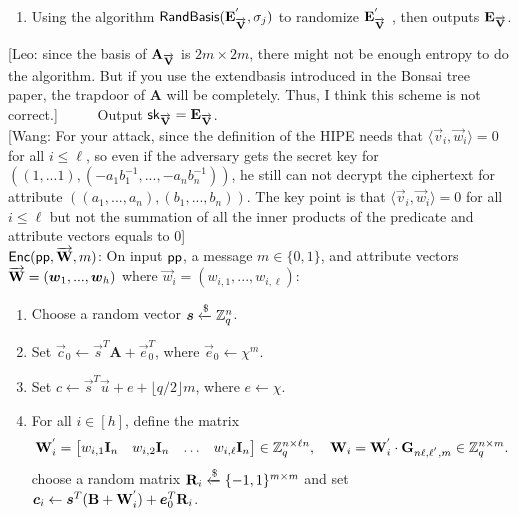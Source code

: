 \documentclass{llncs}
\newcommand{\leo}[1]{{\color{cyan}[Leo: #1]}}
\newcommand{\wang}[1]{{\color{red}[Wang: #1]}}
\begin{document}
\begin{appendix}
\begin{enumerate}
\item Using the algorithm $\mathsf{RandBasis}(\mathbf{E}^{'}_{\overrightarrow{\mathbf{V}}}, \sigma_{j})$ to randomize $\mathbf{E}^{'}_{\overrightarrow{\mathbf{V}}}$ , then outputs $\mathbf{E}_{\overrightarrow{\mathbf{V}}}$.
\end{enumerate}
\leo{since the basis of $\mathbf{A}_{\overrightarrow{\mathbf{V}}}$ is $2m \times 2m$, there might not be enough entropy to do the algorithm. But if you use the extendbasis introduced in the Bonsai tree paper, the trapdoor of $\mathbf{A}$ will be completely. Thus, I think this scheme is not correct.}
~~~~~Output $\mathsf{sk}_{\overrightarrow{\mathbf{V}}}=\mathbf{E}_{\overrightarrow{\mathbf{V}}}$.\\[0.4cm]
\wang{For your attack, since the definition of the HIPE needs that $\langle \vec{v}_{i}, \vec{w}_{i} \rangle = 0$ for all $i\leq \ell$, so even if the adversary gets the secret key for $((1,...1),(-a_{1}b^{-1}_{1},...,-a_{n}b^{-1}_{n}))$, he still can not decrypt the ciphertext for attribute $((a_{1},...,a_{n}),(b_{1},...,b_{n}))$. The key point is that $\langle \vec{v}_{i}, \vec{w}_{i} \rangle = 0$ for all $i\leq \ell$ but not the summation of all the inner products of the predicate and attribute vectors equals to $0$}\\[0.4cm]
$\mathsf{Enc}(\mathsf{pp}, \overrightarrow{\mathbf{W}}, m)$: On input $\mathsf{pp}$, a message $m \in \{0,1\}$, and attribute vectors $\overrightarrow{\mathbf{W}}=(\boldsymbol{w}_{1},...,\boldsymbol{w}_{h})$ where $\vec{w}_{i}=(w_{i,1},...,w_{i,\ell})$:
\begin{enumerate}
\item Choose a random vector $\boldsymbol{s} \xleftarrow{\$} \mathbb{Z}^{n}_{q}$.\\
\item Set $\vec{c}_{0}\leftarrow \vec{s}^{T}\textbf{A}+ \vec{e}^{T}_{0}$, where $\vec{e}_{0}\leftarrow \chi^{m}$.\\
\item Set $c\leftarrow \vec{s}^{T}\vec{u}+e+\lfloor q/2 \rfloor m$, where $e\leftarrow \chi$.\\
\item For all $i \in [h]$, define the matrix
\begin{equation}
\mathbf{W}^{'}_{i}= \begin{bmatrix}
w_{i,1} \mathbf{I}_{n}&w_{i,2} \mathbf{I}_{n}&\ldots&w_{i,\ell} \mathbf{I}_{n}
\end{bmatrix} \in \mathbb{Z}^{n \times \ell n}_{q},~~~ \mathbf{W}_{i}=\mathbf{W}^{'}_{i}\cdot \mathbf{G}_{n\ell,\ell^{'},m} \in \mathbb{Z}^{n \times m}_{q}.
\end{equation}
choose a random matrix $\mathbf{R}_{i} \xleftarrow{\$} \{-1,1\}^{m \times m}$ and set $\boldsymbol{c}_{i} \leftarrow \boldsymbol{s}^{T}(\mathbf{B}+ \mathbf{W}^{'}_{i})+ \boldsymbol{e}^{T}_{0}\mathbf{R}_{i}$.

\end{enumerate}
\end{appendix}
\end{document}
